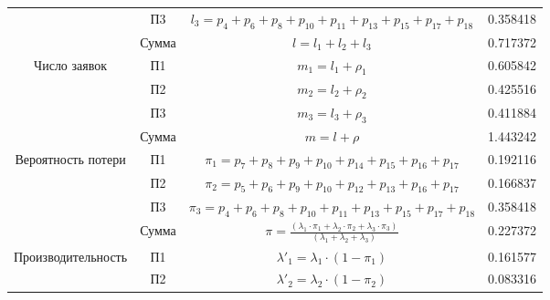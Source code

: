 \begin{adjustbox}{max width=\textwidth}
\begin{tabular}{|c|c|c|c|}
                                    & П3     & $l_3 = p_4+p_6+p_8+p_{10}+p_{11}+p_{13}+p_{15}+p_{17}+p_{18}$                                                 & 0.358418  \\ \cline{2-4}
                                    & Сумма  & $l = l_1+l_2+l_3$                                                                                             & 0.717372  \\ \hline
\multirow{4}{*}{Число заявок}       & П1     & $m_1 = l_1+\rho_1$                                                                                            & 0.605842  \\ \cline{2-4}
                                    & П2     & $m_2 = l_2+\rho_2$                                                                                            & 0.425516  \\ \cline{2-4}
                                    & П3     & $m_3 = l_3+\rho_3$                                                                                            & 0.411884  \\ \cline{2-4}
                                    & Сумма  & $m = l+\rho$                                                                                                  & 1.443242  \\ \hline
\multirow{4}{*}{Вероятность потери} & П1     & $\pi_1 = p_7+p_8+p_9+p_{10}+p_{14}+p_{15}+p_{16}+p_{17}$                                                      & 0.192116  \\ \cline{2-4}
                                    & П2     & $\pi_2 = p_5+p_6+p_9+p_{10}+p_{12}+p_{13}+p_{16}+p_{17}$                                                      & 0.166837  \\ \cline{2-4}
                                    & П3     & $\pi_3 = p_4+p_6+p_8+p_{10}+p_{11}+p_{13}+p_{15}+p_{17}+p_{18}$                                               & 0.358418  \\ \cline{2-4}
                                    & Сумма  & $\pi = \frac{(\lambda_1\cdot\pi_1+\lambda_2\cdot\pi_2+\lambda_3\cdot\pi_3)}{(\lambda_1+\lambda_2+\lambda_3)}$ & 0.227372  \\ \hline
\multirow{4}{*}{Производительность} & П1     & $\lambda'_1 = \lambda_1\cdot (1-\pi_1)$                                                                       & 0.161577  \\ \cline{2-4}
                                    & П2     & $\lambda'_2 = \lambda_2\cdot (1-\pi_2)$                                                                       & 0.083316  \\ \cline{2-4}

\end{tabular}
\end{adjustbox}
